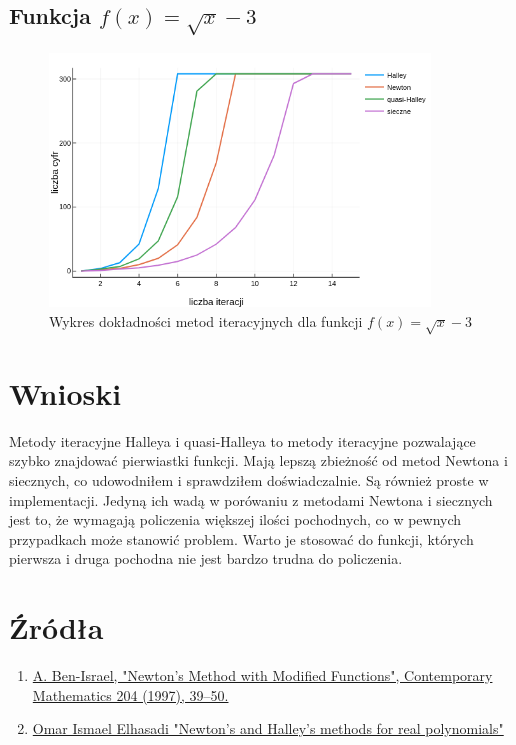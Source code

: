 \documentclass[11pt,a4paper]{article}
\begin{document}
    \subsection{Funkcja $f(x)=\sqrt{x}-3$}

    \begin{figure}[H]
        \includegraphics[width=0.9\textwidth]{wykr4}
        \caption{Wykres dokładności metod iteracyjnych dla funkcji $f(x)=\sqrt{x}-3$}
    \end{figure}



    \section{Wnioski}
    Metody iteracyjne Halleya i quasi-Halleya to metody iteracyjne pozwalające szybko znajdować pierwiastki funkcji. Mają lepszą zbieżność od metod Newtona i siecznych, co udowodniłem i sprawdziłem doświadczalnie. Są również proste w implementacji. Jedyną ich wadą w porówaniu z metodami Newtona i siecznych jest to, że wymagają policzenia większej ilości pochodnych, co w pewnych przypadkach może stanowić problem. Warto je stosować do funkcji, których pierwsza i druga pochodna nie jest bardzo trudna do policzenia.


    \section{Źródła}
    \begin{enumerate}
        \item \href{http://benisrael.net/HALLEY-AMS.pdf}{A. Ben-Israel, "Newton’s Method with Modified Functions", Contemporary Mathematics 204 (1997), 39–50.}
        \item \href{http://webdoc.sub.gwdg.de/ebook/dissts/Dortmund/Elhasadi2007.pdf}{Omar Ismael Elhasadi "Newton’s and Halley’s methods for real
        polynomials" }
    \end{enumerate}
\end{document}
